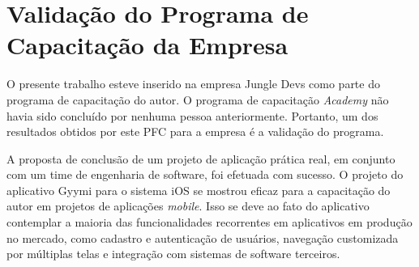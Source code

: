 \section{Validação do Programa de Capacitação da Empresa}
O presente trabalho esteve inserido na empresa Jungle Devs como parte do programa de capacitação do autor. O programa de capacitação \textit{Academy} não havia sido concluído por nenhuma pessoa anteriormente. Portanto, um dos resultados obtidos por este PFC para a empresa é a validação do programa.

A proposta de conclusão de um projeto de aplicação prática real, em conjunto com um time de engenharia de software, foi efetuada com sucesso. O projeto do aplicativo Gyymi para o sistema iOS se mostrou eficaz para a capacitação do autor em projetos de aplicações \textit{mobile}. Isso se deve ao fato do aplicativo contemplar a maioria das funcionalidades recorrentes em aplicativos em produção no mercado, como cadastro e autenticação de usuários, navegação customizada por múltiplas telas e integração com sistemas de software terceiros.


